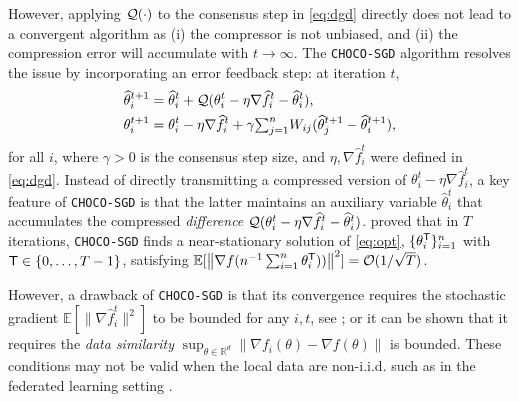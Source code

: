 \documentclass[10pt]{article} %
\theoremstyle{plain}
\theoremstyle{definition}
\theoremstyle{remark}
\newcommand{\prm}{\theta}
\newcommand{\hatprm}{\widehat{\prm}}
\newcommand{\norm}[1]{\left\| #1 \right\|}
\newcommand{\stocgrdf}{\nabla \widehat{f}}
\begin{document}
However, applying ${\cal Q}(\cdot)$ to the consensus step in \eqref{eq:dgd} directly does not lead to a convergent algorithm as (i) the compressor is not unbiased, and (ii) the compression error will accumulate with $t \to \infty$. The {\tt CHOCO-SGD} algorithm \citep{koloskova2019decentralized} resolves the issue by incorporating an error feedback step: at iteration $t$,
\begin{align} 
& \hatprm_i^{t+1} = \hatprm_i^t + {\cal Q}( \prm_i^t - \eta \stocgrdf_i^{t} - \hatprm_i^t ), \\
& \theta_i^{t+1} = \theta_i^t - \eta \stocgrdf_i^{t} + \gamma {\textstyle \sum_{j=1}^n} W_{ij} ( \hatprm_j^{t+1} - \hatprm_i^{t+1} ), \label{eq:choco} 
\end{align}
for all $i$, where $\gamma > 0$ is the consensus step size, and $\eta, \stocgrdf_i^{t}$ were defined in \eqref{eq:dgd}. Instead of directly transmitting a compressed version of $\theta_i^t - \eta \stocgrdf_i^t$, a key feature of {\tt CHOCO-SGD} is that the latter maintains an auxiliary variable $\hatprm_i^{t}$ that accumulates the compressed \emph{difference} ${\cal Q}(\theta_i^t - \eta \stocgrdf_i^t - \hatprm_i^t )$. 
\citet{koloskova2019decentralizeda} proved that in $T$ iterations, {\tt CHOCO-SGD} finds a near-stationary solution of \eqref{eq:opt}, $\{ \theta_i^{\sf T} \}_{i=1}^n$ with ${\sf T} \in \{0,\ldots,T-1\}$, satisfying $\mathbb{E}[ \norm{\nabla f( n^{-1} \sum_{i=1}^n \theta_i^{\sf T} ))}^2 ] = {\cal O}(1/\sqrt{T})$. 

However, a drawback of {\tt CHOCO-SGD} is that its convergence requires the stochastic gradient $\mathbb{E}[ \| \stocgrdf_i^t \|^2 ]$ to be bounded for any $i,t$, see \citep{koloskova2019decentralized, koloskova2019decentralizeda}; or it can be shown that it requires the \emph{data similarity} $\sup_{ \theta \in \mathbb{R}^d} \norm{ \nabla f_i( \theta) - \nabla f( \theta) }$ is bounded. These conditions may not be valid when the local data are non-i.i.d. such as in the federated learning setting \citep{konevcny2016federated}. 
\vspace{-.1cm} 
\end{document}
